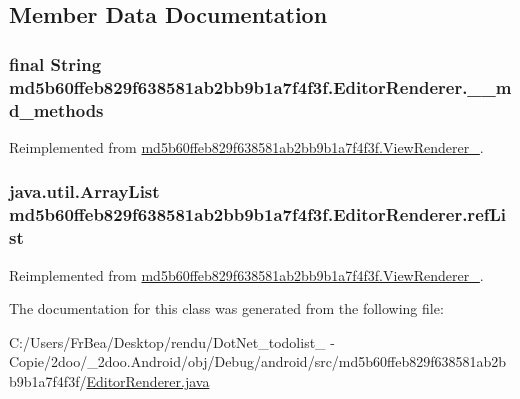 \subsection{Member Data Documentation}
\hypertarget{classmd5b60ffeb829f638581ab2bb9b1a7f4f3f_1_1_editor_renderer_05a5e2737d5175d2d79f153c42ba484d}{
\subsubsection[{\_\-\_\-md\_\-methods}]{\setlength{\rightskip}{0pt plus 5cm}final String {\bf md5b60ffeb829f638581ab2bb9b1a7f4f3f.EditorRenderer.\_\-\_\-md\_\-methods}}}
\label{classmd5b60ffeb829f638581ab2bb9b1a7f4f3f_1_1_editor_renderer_05a5e2737d5175d2d79f153c42ba484d}




Reimplemented from \hyperlink{classmd5b60ffeb829f638581ab2bb9b1a7f4f3f_1_1_view_renderer__2_80b609e3e4054c380887d4dc2907a875}{md5b60ffeb829f638581ab2bb9b1a7f4f3f.ViewRenderer\_}.\hypertarget{classmd5b60ffeb829f638581ab2bb9b1a7f4f3f_1_1_editor_renderer_1cb544d5489e550f07655a227272eb99}{
\subsubsection[{refList}]{\setlength{\rightskip}{0pt plus 5cm}java.util.ArrayList {\bf md5b60ffeb829f638581ab2bb9b1a7f4f3f.EditorRenderer.refList}}}
\label{classmd5b60ffeb829f638581ab2bb9b1a7f4f3f_1_1_editor_renderer_1cb544d5489e550f07655a227272eb99}




Reimplemented from \hyperlink{classmd5b60ffeb829f638581ab2bb9b1a7f4f3f_1_1_view_renderer__2_6c151401977148a92c515e9c7de1aaf8}{md5b60ffeb829f638581ab2bb9b1a7f4f3f.ViewRenderer\_}.

The documentation for this class was generated from the following file:\begin{CompactItemize}
\item 
C:/Users/FrBea/Desktop/rendu/DotNet\_\-todolist\_ - Copie/2doo/\_\-2doo.Android/obj/Debug/android/src/md5b60ffeb829f638581ab2bb9b1a7f4f3f/\hyperlink{_editor_renderer_8java}{EditorRenderer.java}\end{CompactItemize}
